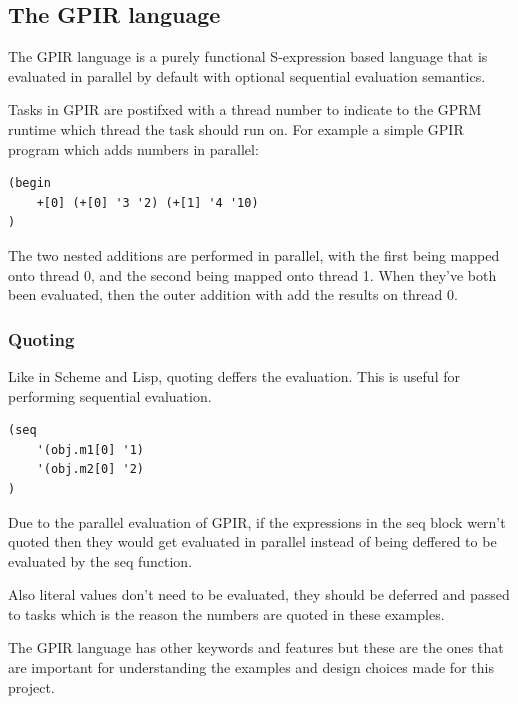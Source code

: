 \subsection{The GPIR language}

The GPIR language is a purely functional S-expression based language that is evaluated in parallel by default 
with optional sequential evaluation semantics.

Tasks in GPIR are postifxed with a thread number to indicate to the GPRM runtime which thread
the task should run on. For example a simple GPIR program which adds numbers in parallel:

\begin{lstlisting}[style=myGPC]
(begin
    +[0] (+[0] '3 '2) (+[1] '4 '10)
)
\end{lstlisting}

The two nested additions are performed in parallel, with the first being mapped onto thread 0,
and the second being mapped onto thread 1. When they've both been evaluated, then the outer addition
with add the results on thread 0.

\subsubsection{Quoting}

Like in Scheme and Lisp, quoting deffers the evaluation. This is useful for performing sequential evaluation.

\begin{lstlisting}[style=myGPC]
(seq 
    '(obj.m1[0] '1)
    '(obj.m2[0] '2)
)
\end{lstlisting}

Due to the parallel evaluation of GPIR, if the expressions in the seq block wern't quoted then
they would get evaluated in parallel instead of being deffered to be evaluated by the seq function.

Also literal values don't need to be evaluated, they should be deferred and passed to tasks which is
the reason the numbers are quoted in these examples.

The GPIR language has other keywords and features but these are the ones that are important for
understanding the examples and design choices made for this project.
